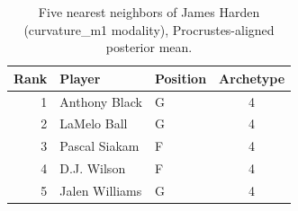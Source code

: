\begin{table}[htbp]
  \centering\small
  \begin{tabular}{rllc}
    \toprule
    Rank & Player & Position & Archetype \\
    \midrule
    1 & Anthony Black & G & 4 \\
    2 & LaMelo Ball & G & 4 \\
    3 & Pascal Siakam & F & 4 \\
    4 & D.J. Wilson & F & 4 \\
    5 & Jalen Williams & G & 4 \\
    \bottomrule
  \end{tabular}
  \caption{Five nearest neighbors of James Harden (curvature_m1 modality), Procrustes-aligned posterior mean.}
  \label{tab:James_Harden_neighbors_curvature_m1}
\end{table}

